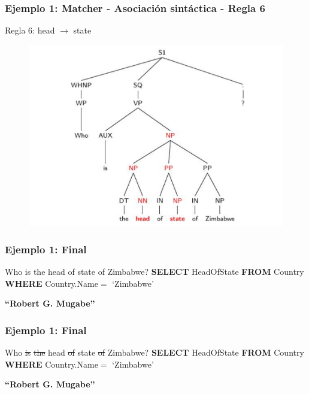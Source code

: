 \begin{frame}[t]
\frametitle{Ejemplo 1: Matcher - Asociación sintáctica - Regla 6}
\Large{Regla 6: head $\rightarrow$ state}
\begin{center}

\begin{figure}
  \centering
    \includegraphics[scale=.5]{graficos/presentacion/ejemplo-charniak-1}
\end{figure}
\end{center}
\end{frame}

\begin{frame}[t]
\frametitle{Ejemplo 1: Final}
\Large{Who is the head of state of Zimbabwe? 
\bigskip
\newline
{\color{white}\textbf{{\color{white}SELECT}} HeadOfState \newline
{\color{white}\textbf{FROM}} Country \newline
{\color{white}\textbf{WHERE}} Country.Name$=$ {\color{white}`Zimbabwe'}
}}

\bigskip

{\color{white}\textbf{``Robert G. Mugabe''}}

\end{frame}



\begin{frame}[t]
\frametitle{Ejemplo 1: Final}
\Large{{\color{blue}Who} \st{is} \st{the} {\color{blue}head} \st{of} {\color{blue}state} \st{of} {\color{purple}Zimbabwe}? 
\bigskip
\newline
{\color{white}\textbf{{\color{white}SELECT}} HeadOfState \newline
{\color{white}\textbf{FROM}} Country \newline
{\color{white}\textbf{WHERE}} Country.Name$=$ {\color{white}`Zimbabwe'}
}}

\bigskip

{\color{white}\textbf{``Robert G. Mugabe''}}

\end{frame}

